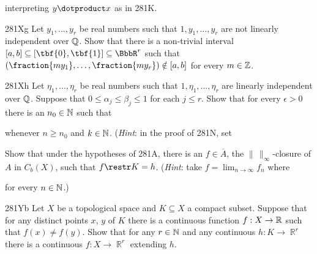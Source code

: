 { 
      
      
\noindent interpreting $y\dotproduct x$ as in 281K. 
      
\spheader 281Xg Let $y_1,\ldots,y_r$ be real numbers such that
$1,y_1,\ldots,y_r$ are 
not linearly independent over $\Bbb Q$.   Show that there is a 
non-trivial interval $[a,b]\subseteq[\tbf{0},\tbf{1}]\subseteq\BbbR^r$ 
such that $(\fraction{my_1},\ldots,\fraction{my_r})\notin[a,b]$ for 
every $m\in\Bbb Z$. 
      
\spheader 281Xh Let $\eta_1,\ldots,\eta_r$ be real numbers such 
that $1,\eta_1,\ldots,\eta_r$ are 
linearly independent over $\Bbb Q$.   Suppose that 
$0\le\alpha_j\le\beta_j\le 1$ for each $j\le r$.   
Show that for every $\epsilon>0$ there is an $n_0\in\Bbb N$ such that 
      
 
\noindent whenever $n\ge n_0$ and $k\in\Bbb N$.   ({\it Hint\/}: 
in the proof of 281N, set  
 
      
 Show that under the hypotheses of 
281A, there is 
an $f\in\overline{A}$, the $\|\,\|_{\infty}$-closure of $A$ in $C_b(X)$, 
such that $f\restr K=h$.   ({\it Hint\/}:  take $f=\lim_{n\to\infty}f_n$ 
where 
      
      
\noindent for every $n\in\Bbb N$.) 
      
      
\spheader 281Yb Let $X$ be a topological space and 
$K\subseteq X$ a compact subset.   Suppose that for any distinct points 
$x$, $y$ of $K$ there is a continuous function $f:X\to\Bbb R$ such that 
$f(x)\ne f(y)$.   Show that for any $r\in\Bbb N$ and any continuous 
$h:K\to\BbbR^r$ there is a continuous $f:X\to\BbbR^r$ extending $h$. 
      
}
